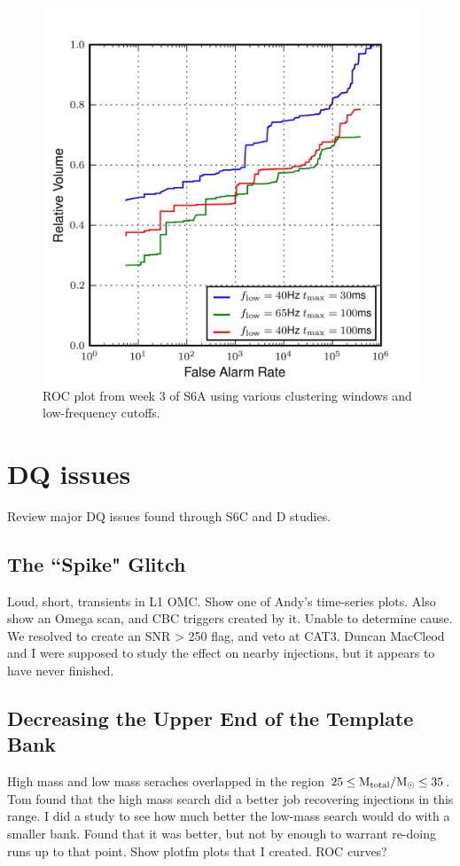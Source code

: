 \begin{figure}[p]
\label{fig:roc_cluster_windows}
\center
\includegraphics[width=6in]{figures/s6_clusterwin_investigation/s6week3cat4_ROC.png}
\caption{ROC plot from week 3 of S6A using various clustering windows and low-frequency cutoffs.}
\end{figure}

\section{DQ issues}

Review major DQ issues found through S6C and D studies.

\subsection{The ``Spike" Glitch}
Loud, short, transients in L1 OMC. Show one of Andy's time-series plots. Also show an Omega scan, and \ac{CBC} triggers created by it. Unable to determine cause. We resolved to create an \ac{SNR} > 250 flag, and veto at CAT3. Duncan MacCleod and I were supposed to study the effect on nearby injections, but it appears to have never finished.

\subsection{Decreasing the Upper End of the Template Bank}
High mass and low mass seraches overlapped in the region $25 \leq \mathrm{M_{total}}/\mathrm{M_\odot} \leq 35$. Tom found that the high mass search did a better job recovering injections in this range. I did a study to see how much better the low-mass search would do with a smaller bank. Found that it was better, but not by enough to warrant re-doing runs up to that point. Show plotfm plots that I created. ROC curves?

